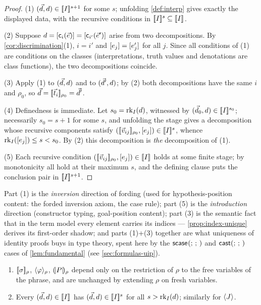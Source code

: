 \begin{proof}
(1) $(\vec{d}, d) \in [\![ I ]\!]^{s+1}$ for some $s$; unfolding
\cref{def:interp} gives exactly the displayed data, with the recursive
conditions in $[\![ I ]\!]^{s} \subseteq [\![ I ]\!]_{}$.

(2) Suppose $d = [\mathsf{c}_i(\vec{e})] = [\mathsf{c}_{i'}
(\vec{e}')]$ arise from two decompositions.  By
\cref{cor:discrimination}(1), $i = i'$ and $[e_j] = [e'_j]$ for
all $j$.  Since all conditions of (1) are conditions on the classes
(interpretations, truth values and denotations are class functions),
the two decompositions coincide.

(3) Apply (1) to $(\vec{d}, d)$ and to $(\vec{d}', d)$; by (2) both
decompositions have the same $i$ and $\rho_0$, so $\vec{d} =
[\![ \vec{t}_i ]\!]_{\rho_0} = \vec{d}'$.

(4) Definedness is immediate.  Let $s_0 = \mathrm{rk}_{I}(d)$, witnessed by
$(\vec{d}_0, d) \in [\![ I ]\!]^{s_0}$; necessarily $s_0 = s + 1$ for some
$s$, and unfolding the stage gives a decomposition whose recursive
components satisfy $([\![ \vec{v}_{ij} ]\!]_{\rho_0}, [e_j]) \in
[\![ I ]\!]^{s}$, whence $\mathrm{rk}_{I}([e_j]) \le s < s_0$.  By (2) this
decomposition is \emph{the} decomposition of (1).

(5) Each recursive condition $([\![ \vec{v}_{ij} ]\!]_{\rho_0}, [e_j])
\in [\![ I ]\!]_{}$ holds at some finite stage; by monotonicity all hold at
their maximum $s$, and the defining clause puts the conclusion pair in
$[\![ I ]\!]^{s+1}$.
\end{proof}

Part (1) is the \emph{inversion} direction of fording (used for
hypothesis-position content: the forded inversion axiom, the case rule);
part (5) is the \emph{introduction} direction (constructor typing,
goal-position content); part (3) is the semantic fact that in the term
model every element carries its indices --- \cref{prop:index-unique}
derives its first-order shadow; and parts (1)+(3) together are what
uniqueness of identity proofs buys in type theory, spent here by the
$\mathsf{scase}_{}(;\,;\,)$ and $\mathsf{cast}(;\,;\,)$ cases of \cref{lem:fundamental}
(see \cref{sec:formulas-uip}).

\begin{lemma}
\label{lem:sem-basic}
\begin{enumerate}[leftmargin=2em]
\item $[\![ \sigma ]\!]_{\rho}$, $\langle \varphi \rangle_{\rho}$, $(\!| P |\!)_\rho$ depend
  only on the restriction of $\rho$ to the free variables of the phrase,
  and are unchanged by extending $\rho$ on fresh variables.
\item Every $(\vec{d}, d) \in [\![ I ]\!]_{}$ has $(\vec{d},d) \in
  [\![ I ]\!]^{s}$ for all $s > \mathrm{rk}_{I}(d)$; similarly for $\langle J \rangle$.
\end{enumerate}
\end{lemma}

